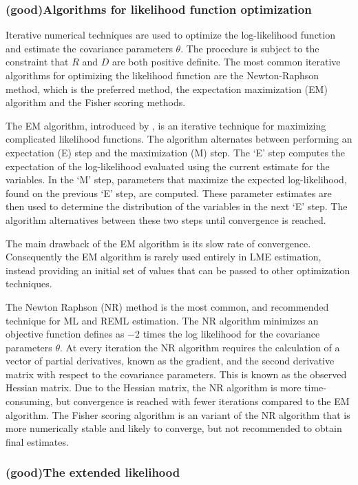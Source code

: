 \documentclass[12pt, a4paper]{report}
\theoremstyle{plain}
\theoremstyle{definition}
\theoremstyle{remark}
\begin{document}
			\subsubsection{ (good)Algorithms for likelihood function optimization}Iterative numerical techniques are used to optimize the log-likelihood function and estimate the covariance parameters $\theta$. The procedure is subject to the constraint that $R$ and $D$ are both positive definite. The most common iterative algorithms for optimizing the likelihood function are the Newton-Raphson method, which is the preferred method, the expectation maximization (EM) algorithm and the Fisher scoring methods.
			
			The EM algorithm, introduced by \citet{EM}, is an iterative technique for maximizing complicated likelihood functions. The algorithm alternates between performing an expectation (E) step
			and the maximization (M) step. The `E' step computes the expectation of the log-likelihood evaluated using the current
			estimate for the variables. In the `M' step, parameters that maximize the expected log-likelihood, found on the previous `E' step, are computed. These parameter estimates are then used to determine the distribution of the variables in the next `E' step. The algorithm alternatives between these two steps until convergence is reached.
			
			The main drawback of the EM algorithm is its slow rate of
			convergence. Consequently the EM algorithm is rarely used entirely in LME estimation,
			instead providing an initial set of values that can be passed to
			other optimization techniques.
			
			The Newton Raphson (NR) method is the most common, and recommended technique for ML and
			REML estimation. The NR algorithm minimizes an objective function defines as $-2$ times the log likelihood for the covariance parameters $\theta$. At every iteration the NR algorithm requires the
			calculation of a vector of partial derivatives, known as the gradient, and the second derivative matrix with respect to the covariance parameters. This is known as the observed Hessian matrix. Due to the Hessian matrix, the NR algorithm is more time-consuming, but convergence is reached with fewer iterations compared to the EM algorithm. The Fisher scoring algorithm is an variant of the NR algorithm that is more numerically stable and likely to converge, but not recommended to obtain final estimates.
			
			\subsubsection{ (good)The extended likelihood}
			
\end{document}
